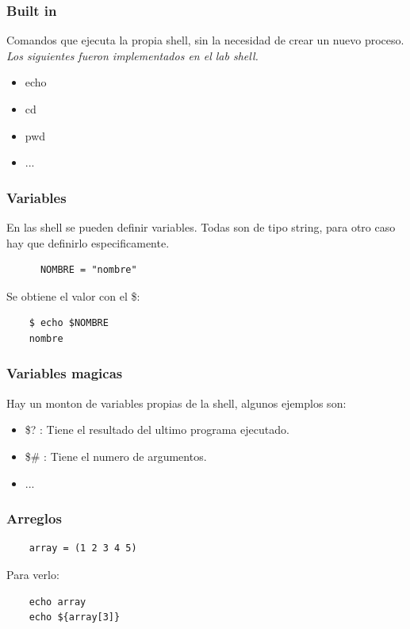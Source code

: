 \documentclass[titlepage,a4paper]{article}
\begin{document}
\subsubsection*{Built in}
Comandos que ejecuta la propia shell, sin la necesidad de crear un nuevo proceso. \textit{Los siguientes fueron implementados en el lab shell.}
\begin{itemize}
    \item echo
    \item cd
    \item pwd
    \item ...
\end{itemize}

\subsubsection*{Variables}
En las shell se pueden definir variables. Todas son de tipo string, para otro caso hay que definirlo especificamente.
\begin{verbatim}
      NOMBRE = "nombre"
\end{verbatim}

Se obtiene el valor con el \$:
\begin{verbatim}
    $ echo $NOMBRE
    nombre
\end{verbatim}

\subsubsection*{Variables magicas}
Hay un monton de variables propias de la shell, algunos ejemplos son:
\begin{itemize}
    \item \$? : Tiene el resultado del ultimo programa ejecutado.
    \item \$\# : Tiene el numero de argumentos.
    \item ...
\end{itemize}

\subsubsection*{Arreglos}
\begin{verbatim}
    array = (1 2 3 4 5)
\end{verbatim}

Para verlo:
\begin{verbatim}
    echo array
    echo ${array[3]}
\end{verbatim}
\end{document}
